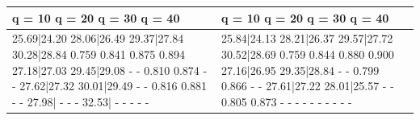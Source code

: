 \begin{tabular}{ll}
\toprule
q = 10 q = 20 q = 30 q = 40 & q = 10 q = 20 q = 30 q = 40 \\
\midrule
25.69|24.20 28.06|26.49 29.37|27.84 30.28|28.84 0.759 0.841 0.875 0.894 27.18|27.03 29.45|29.08 - - 0.810 0.874 - - 27.62|27.32 30.01|29.49 - - 0.816 0.881 - - 27.98| - - - 32.53| - - - - - & 25.84|24.13 28.21|26.37 29.57|27.72 30.52|28.69 0.759 0.844 0.880 0.900 27.16|26.95 29.35|28.84 - - 0.799 0.866 - - 27.61|27.22 28.01|25.57 - - 0.805 0.873 - - - - - - - - - - \\
\bottomrule
\end{tabular}
